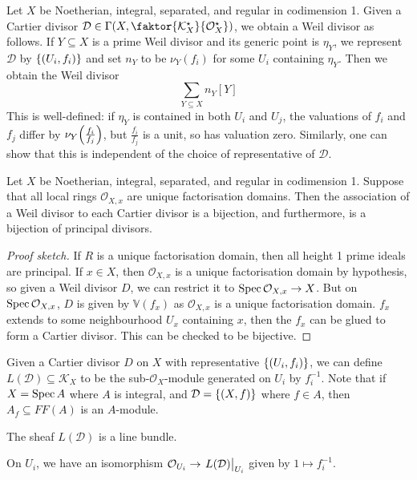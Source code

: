 Let \( X \) be Noetherian, integral, separated, and regular in codimension 1.
Given a Cartier divisor \( \mathcal D \in \Gamma\qty(X, \faktor{\mathcal K_X^\star}{\mathcal O_X^\star}) \), we obtain a Weil divisor as follows.
If \( Y \subseteq X \) is a prime Weil divisor and its generic point is \( \eta_Y \), we represent \( \mathcal D \) by \( \qty{(U_i, f_i)} \) and set \( n_Y \) to be \( \nu_Y(f_i) \) for some \( U_i \) containing \( \eta_Y \).
Then we obtain the Weil divisor
\[ \sum_{Y \subseteq X} n_Y [Y] \]
This is well-defined: if \( \eta_Y \) is contained in both \( U_i \) and \( U_j \), the valuations of \( f_i \) and \( f_j \) differ by \( \nu_Y\qty(\frac{f_i}{f_j}) \), but \( \frac{f_i}{f_j} \) is a unit, so has valuation zero.
Similarly, one can show that this is independent of the choice of representative of \( \mathcal D \).
\begin{proposition}
    Let \( X \) be Noetherian, integral, separated, and regular in codimension 1.
    Suppose that all local rings \( \mathcal O_{X,x} \) are unique factorisation domains.
    Then the association of a Weil divisor to each Cartier divisor is a bijection, and furthermore, is a bijection of principal divisors.
\end{proposition}
\begin{proof}[Proof sketch]
    If \( R \) is a unique factorisation domain, then all height 1 prime ideals are principal.
    If \( x \in X \), then \( \mathcal O_{X, x} \) is a unique factorisation domain by hypothesis, so given a Weil divisor \( D \), we can restrict it to \( \operatorname{Spec} \mathcal O_{X, x} \to X \).
    But on \( \operatorname{Spec} \mathcal O_{X, x} \), \( D \) is given by \( \mathbb V(f_x) \) as \( \mathcal O_{X, x} \) is a unique factorisation domain.
    \( f_x \) extends to some neighbourhood \( U_x \) containing \( x \), then the \( f_x \) can be glued to form a Cartier divisor.
    This can be checked to be bijective.
\end{proof}
Given a Cartier divisor \( D \) on \( X \) with representative \( \qty{(U_i, f_i)} \), we can define \( L(\mathcal D) \subseteq \mathcal K_X \) to be the sub-\( \mathcal O_X \)-module generated on \( U_i \) by \( f_i^{-1} \).
Note that if \( X = \operatorname{Spec} A \) where \( A \) is integral, and \( \mathcal D = \qty{(X, f)} \) where \( f \in A \), then \( A_f \subseteq FF(A) \) is an \( A \)-module.
\begin{proposition}
    The sheaf \( L(\mathcal D) \) is a line bundle.
\end{proposition}
\begin{proposition}
    On \( U_i \), we have an isomorphism \( \mathcal O_{U_i} \to \eval{L(\mathcal D)}_{U_i} \) given by \( 1 \mapsto f_i^{-1} \).
\end{proposition}
